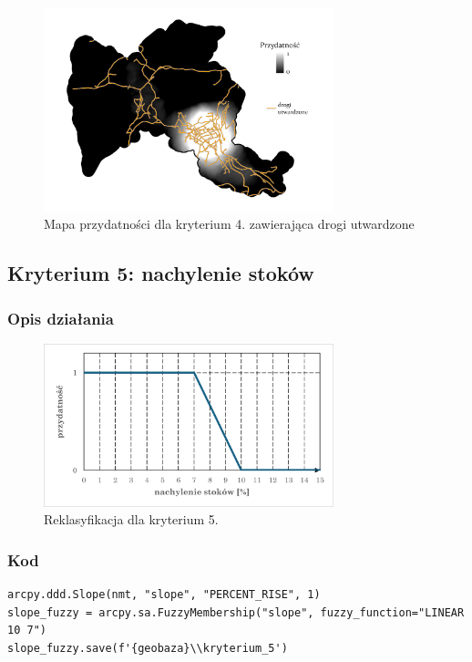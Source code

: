 \documentclass{article}
\begin{document}
\begin{figure}[H]
    \centering
    \includegraphics[width=0.75\textwidth]{img/kryterium4-drogi.jpg}
    \caption*{Mapa przydatności dla kryterium 4. zawierająca drogi utwardzone}
\end{figure}

\newpage
\subsection{Kryterium 5: nachylenie stoków}
\subsubsection{Opis działania}
\begin{figure}[H]
    \centering
    \includegraphics[width=0.75\textwidth]{img/kryterium5-wykres-glowny.png}
    \caption*{Reklasyfikacja dla kryterium 5.}
\end{figure}

\subsubsection{Kod}
\begin{lstlisting}
arcpy.ddd.Slope(nmt, "slope", "PERCENT_RISE", 1)
slope_fuzzy = arcpy.sa.FuzzyMembership("slope", fuzzy_function="LINEAR 10 7")
slope_fuzzy.save(f'{geobaza}\\kryterium_5')
\end{lstlisting}
\end{document}
